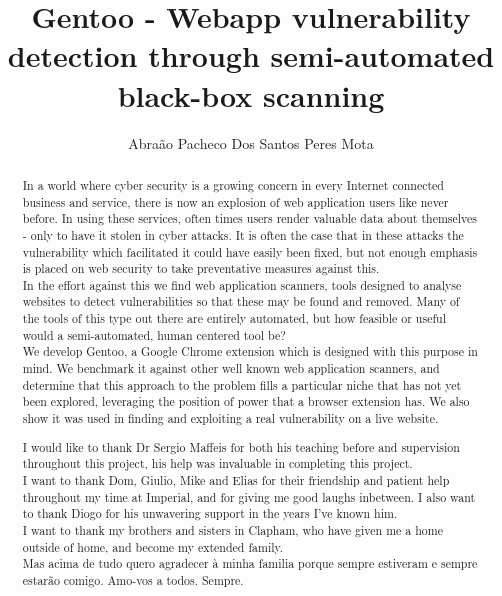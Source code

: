 \documentclass[a4paper, twoside]{report}
\title{Gentoo - Webapp vulnerability detection through semi-automated black-box scanning}
\author{Abra\~{a}o Pacheco Dos Santos Peres Mota}
\begin{document}


\clearpage{\pagestyle{fancy}\cleardoublepage}
\begin{abstract}
In a world where cyber security is a growing concern in every Internet connected business and service, there is now an explosion of web application users like never before. In using these services, often times users render valuable data about themselves - only to have it stolen in cyber attacks. It is often the case that in these attacks the vulnerability which facilitated it could have easily been fixed, but not enough emphasis is placed on web security to take preventative measures against this. \\

In the effort against this we find web application scanners, tools designed to analyse websites to detect vulnerabilities so that these may be found and removed. Many of the tools of this type out there are entirely automated, but how feasible or useful would a semi-automated, human centered tool be? \\

We develop Gentoo, a Google Chrome extension which is designed with this purpose in mind. We benchmark it against other well known web application scanners, and determine that this approach to the problem fills a particular niche that has not yet been explored, leveraging the position of power that a browser extension has. We also show it was used in finding and exploiting a real vulnerability on a live website.
\end{abstract}


\clearpage{\pagestyle{fancy}\cleardoublepage}

\renewcommand{\abstractname}{Acknowledgements}
\begin{abstract}
	
I would like to thank Dr Sergio Maffeis for both his teaching before and supervision throughout this project, his help was invaluable in completing this project. \\

I want to thank Dom, Giulio, Mike and Elias for their friendship and patient help throughout my time at Imperial, and for giving me good laughs inbetween. I also want to thank Diogo for his unwavering support in the years I've known him. \\

I want to thank my brothers and sisters in Clapham, who have given me a home outside of home, and become my extended family. \\

\vspace{15mm}
Mas acima de tudo quero agradecer \`a minha familia porque sempre estiveram e sempre estar\~ao comigo. Amo-vos a todos. Sempre.
\end{abstract}
\end{document}
